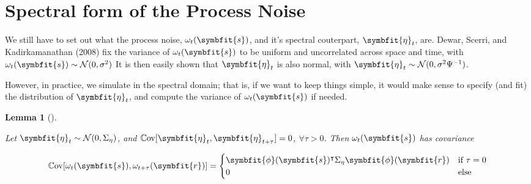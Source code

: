 \documentclass[
]{report}
\DeclareMathOperator{\cov}{\mathbb{C}\mathrm{ov}}
\newcommand{\bv}[1]{\symbfit{#1}}
\theoremstyle{plain}
\theoremstyle{plain}
\newtheorem{lemma}{Lemma}[section]
\theoremstyle{plain}
\theoremstyle{remark}
\begin{document}
\section{Spectral form of the Process
Noise}\label{spectral-form-of-the-process-noise}

We still have to set out what the process noise, \(\omega_t(\bv s)\),
and it's spectral couterpart, \(\bv \eta_t\), are. Dewar, Scerri, and
Kadirkamanathan (2008) fix the variance of \(\omega_t(\bv s)\) to be
uniform and uncorrelated across space and time, with
\(\omega_t(\bv s) \sim \mathcal N(0,\sigma^2)\) It is then easily shown
that \(\bv\eta_t\) is also normal, with
\(\bv\eta_t \sim \mathcal N(0, \sigma^2\Psi^{-1})\).

However, in practice, we simulate in the spectral domain; that is, if we
want to keep things simple, it would make sense to specify (and fit) the
distribution of \(\bv\eta_t\), and compute the variance of
\(\omega_t(\bv s)\) if needed.

\begin{lemma}[]\protect\hypertarget{lem-omegadist}{}\label{lem-omegadist}

Let \(\bv\eta_t \sim \mathcal N(0, \Sigma_\eta)\), and
\(\cov[\bv\eta_t, \bv \eta_{t+\tau}] =0\), \(\forall \tau>0\). Then
\(\omega_t(\bv s)\) has covariance

\[\cov [\omega_t(\bv s), \omega_{t+\tau}(\bv r)] = \begin{cases}
\bv\phi(\bv s)^\intercal \Sigma_\eta \bv\phi(\bv r) & \text{if }\tau=0\\
0 & \text{else}\\
\end{cases}
\]

\end{lemma}
\end{document}
